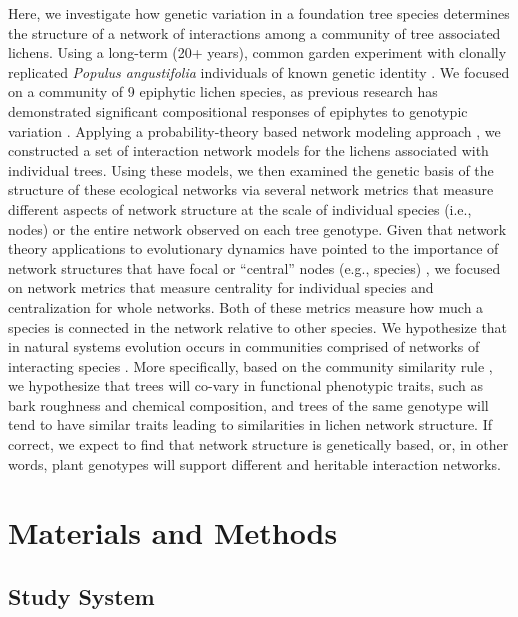 \documentclass[fleqn,12pt]{olplainarticle}
\begin{document}
Here, we investigate how genetic variation in a foundation tree
species determines the structure of a network of interactions among a
community of tree associated lichens.  Using a long-term (20+ years),
common garden experiment with clonally replicated \textit{Populus
  angustifolia} individuals of known genetic identity
\citep{Martinsen2001HybridSpecies}. We focused on a community of 9
epiphytic lichen species, as previous research has demonstrated
significant compositional responses of epiphytes to genotypic
variation \citep{Winfree2011, Zytynska2011}. Applying a
probability-theory based network modeling approach \citep{Araujo2011},
we constructed a set of interaction network models for the lichens
associated with individual trees. Using these models, we then examined
the genetic basis of the structure of these ecological networks via
several network metrics that measure different aspects of network
structure at the scale of individual species (i.e., nodes) or the
entire network observed on each tree genotype. Given that network
theory applications to evolutionary dynamics have pointed to the
importance of network structures that have focal or ``central'' nodes
(e.g., species) \citep{Lieberman2005EvolutionaryGraphs}, we focused on
network metrics that measure centrality for individual species and
centralization for whole networks. Both of these metrics measure how
much a species is connected in the network relative to other
species. We hypothesize that in natural systems evolution occurs in
communities comprised of networks of interacting species
\citep{Lau2015a, Keith2017, Thompson2013, Bascompte2006}. More
specifically, based on the community similarity rule
\cite{Bangert2006}, we hypothesize that trees will co-vary in
functional phenotypic traits, such as bark roughness and chemical
composition, and trees of the same genotype will tend to have similar
traits leading to similarities in lichen network structure. If
correct, we expect to find that network structure is genetically
based, or, in other words, plant genotypes will support different and
heritable interaction networks.


\section*{Materials and Methods}


\subsection*{Study System}
\end{document}
